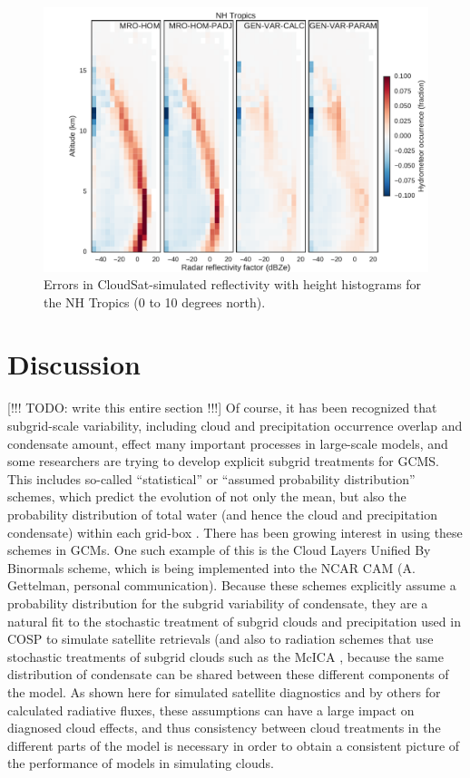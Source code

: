 \begin{figure}
\centering
\includegraphics[width=\columnwidth]{graphics/subgrid2_cfadDbze94_NHTropics_all_diff.pdf}
\caption{Errors in CloudSat-simulated reflectivity with height histograms for the NH Tropics (0 to 10 degrees north).}
\label{sgi_cfadDbze94_NHTropics_all_diff}
\end{figure}

\section{Discussion}
\label{subgrid2_discussion_section}
[!!! TODO: write this entire section !!!]
Of course, it has been recognized that subgrid-scale variability, including cloud and precipitation occurrence overlap and condensate amount, effect many important processes in large-scale models, and some researchers are trying to develop explicit subgrid treatments for GCMS. This includes so-called ``statistical'' or ``assumed probability distribution'' schemes, which predict the evolution of not only the mean, but also the probability distribution of total water (and hence the cloud and precipitation condensate) within each grid-box \citep[e.g.,][]{tompkins_2002}. There has been growing interest in using these schemes in GCMs. One such example of this is the Cloud Layers Unified By Binormals \citep[CLUBB;][]{golaz_et_al_2002} scheme, which is being implemented into the NCAR CAM (A. Gettelman, personal communication). Because these schemes explicitly assume a probability distribution for the subgrid variability of condensate, they are a natural fit to the stochastic treatment of subgrid clouds and precipitation used in COSP to simulate satellite retrievals (and also to radiation schemes that use stochastic treatments of subgrid clouds such as the McICA \citep{pincus_et_al_2003}, because the same distribution of condensate can be shared between these different components of the model. As shown here for simulated satellite diagnostics and by others for calculated radiative fluxes, these assumptions can have a large impact on diagnosed cloud effects, and thus consistency between cloud treatments in the different parts of the model is necessary in order to obtain a consistent picture of the performance of models in simulating clouds.

